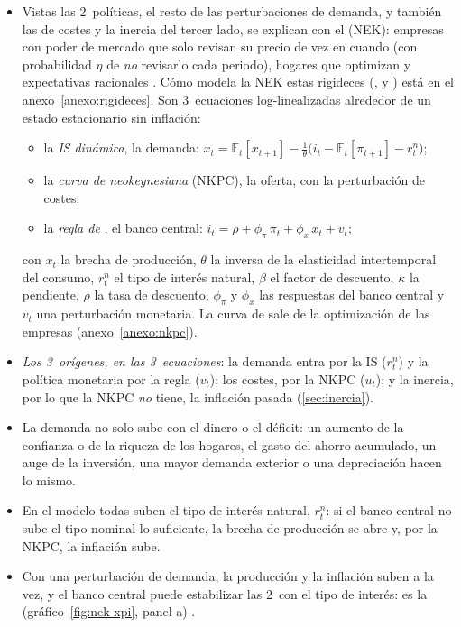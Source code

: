 \documentclass[11pt]{article}
\begin{document}
\begin{itemize}
\item Vistas las 2~políticas, el resto de las perturbaciones de demanda, y también las de costes y la inercia del tercer lado, se explican con el  (NEK): empresas con poder de mercado que solo revisan su precio de vez en cuando (con probabilidad $\eta$ de \emph{no} revisarlo cada periodo)\nocite{Calvo1983Staggered,Gali2015Monetary}, hogares que optimizan y expectativas racionales . Cómo modela la NEK estas rigideces (,  y ) está en el anexo~\ref{anexo:rigideces}. Son 3~ecuaciones log-linealizadas alrededor de un estado estacionario sin inflación:
  \begin{itemize}
  \item la \emph{IS dinámica}, la demanda: $x_t=\mathbb{E}_t[x_{t+1}]-\frac{1}{\theta}\big(i_t-\mathbb{E}_t[\pi_{t+1}]-r^n_t\big)$;
  \item la \emph{curva de  neokeynesiana} (NKPC), la oferta, con la perturbación de costes:
  \item la \emph{regla de }, el banco central: $i_t=\rho+\phi_\pi\,\pi_t+\phi_x\,x_t+v_t$;
  \end{itemize}
  con $x_t$ la brecha de producción, $\theta$ la inversa de la elasticidad intertemporal del consumo, $r^n_t$ el tipo de interés natural, $\beta$ el factor de descuento, $\kappa$ la pendiente, $\rho$ la tasa de descuento, $\phi_\pi$ y $\phi_x$ las respuestas del banco central y $v_t$ una perturbación monetaria. La curva de  sale de la optimización de las empresas (anexo~\ref{anexo:nkpc}).
\item \emph{Los 3~orígenes, en las 3~ecuaciones}: la demanda entra por la IS ($r^n_t$) y la política monetaria por la regla ($v_t$); los costes, por la NKPC ($u_t$); y la inercia, por lo que la NKPC \emph{no} tiene, la inflación pasada (\ref{sec:inercia}).
\end{itemize}

\begin{itemize}
\item La demanda no solo sube con el dinero o el déficit: un aumento de la confianza o de la riqueza de los hogares, el gasto del ahorro acumulado, un auge de la inversión, una mayor demanda exterior o una depreciación hacen lo mismo.
\item En el modelo todas suben el tipo de interés natural, $r^n_t$: si el banco central no sube el tipo nominal lo suficiente, la brecha de producción se abre y, por la NKPC, la inflación sube.
\item Con una perturbación de demanda, la producción y la inflación suben a la vez, y el banco central puede estabilizar las 2~con el tipo de interés: es la  (gráfico~\ref{fig:nek-xpi}, panel a) .
\end{itemize}
\end{document}
